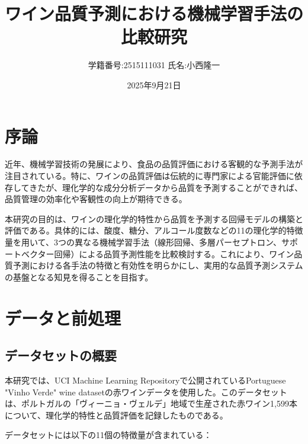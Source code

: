 \documentclass[12pt,a4paper,dvipdfmx]{jsarticle}
\title{ワイン品質予測における機械学習手法の比較研究}
\author{学籍番号:2515111031
氏名:小西隆一}
\date{2025年9月21日}
\begin{document}
\maketitle

\section{序論}

近年、機械学習技術の発展により、食品の品質評価における客観的な予測手法が注目されている。特に、ワインの品質評価は伝統的に専門家による官能評価に依存してきたが、理化学的な成分分析データから品質を予測することができれば、品質管理の効率化や客観性の向上が期待できる。

本研究の目的は、ワインの理化学的特性から品質を予測する回帰モデルの構築と評価である。具体的には、酸度、糖分、アルコール度数などの11の理化学的特徴量を用いて、3つの異なる機械学習手法（線形回帰、多層パーセプトロン、サポートベクター回帰）による品質予測性能を比較検討する。これにより、ワイン品質予測における各手法の特徴と有効性を明らかにし、実用的な品質予測システムの基盤となる知見を得ることを目指す。

\section{データと前処理}

\subsection{データセットの概要}

本研究では、UCI Machine Learning Repositoryで公開されているPortuguese "Vinho Verde" wine datasetの赤ワインデータを使用した。このデータセットは、ポルトガルの「ヴィーニョ・ヴェルデ」地域で生産された赤ワイン1,599本について、理化学的特性と品質評価を記録したものである。

データセットには以下の11個の特徴量が含まれている：
\end{document}
